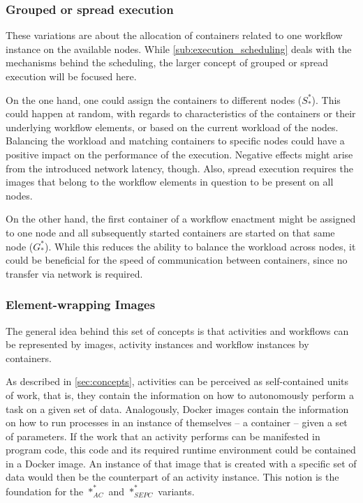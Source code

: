   \subsubsection{Grouped or spread execution} %
  \label{ssub:grouped_or_spread_execution}
    These variations are about the allocation of containers related to one workflow instance on the available nodes. While \ref{sub:execution_scheduling} deals with the mechanisms behind the scheduling, the larger concept of grouped or spread execution will be focused here.

    On the one hand, one could assign the containers to different nodes ($S_*^*$). This could happen at random, with regards to characteristics of the containers or their underlying workflow elements, or based on the current workload of the nodes. Balancing the workload and matching containers to specific nodes could have a positive impact on the performance of the execution. Negative effects might arise from the introduced network latency, though. Also, spread execution requires the images that belong to the workflow elements in question to be present on all nodes.

    On the other hand, the first container of a workflow enactment might be assigned to one node and all subsequently started containers are started on that same node ($G_*^*$). While this reduces the ability to balance the workload across nodes, it could be beneficial for the speed of communication between containers, since no transfer via network is required.

  \subsubsection{Element-wrapping Images} %
  \label{ssub:element_wrapping_containers}
    The general idea behind this set of concepts is that activities and workflows can be represented by images, activity instances and workflow instances by containers.

    As described in \ref{sec:concepts}, activities can be perceived as self-contained units of work, that is, they contain the information on how to autonomously perform a task on a given set of data.
    Analogously, Docker images contain the information on how to run processes in an instance of themselves -- a container -- given a set of parameters. If the work that an activity performs can be manifested in  program code, this code and its required runtime environment could be contained in a Docker image. An instance of that image that is created with a specific set of data would then be the counterpart of an activity instance. This notion is the foundation for the $*_{AC}^{*}$ and $*_{SEPC}^{*}$ variants.

